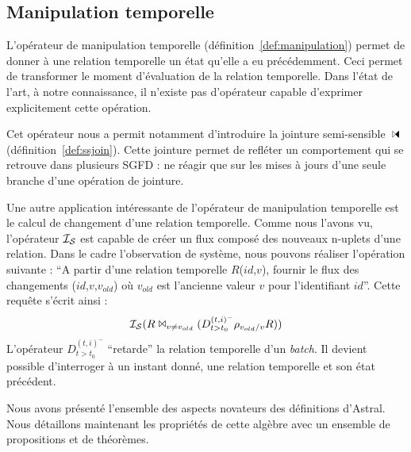 \subsection{Manipulation temporelle}
L'opérateur de manipulation temporelle (définition~\ref{def:manipulation}) permet de donner à une relation temporelle un état qu'elle a eu précédemment. Ceci permet de transformer le moment d'évaluation de la relation temporelle. Dans l'état de l'art, à notre connaissance, il n'existe pas d'opérateur capable d'exprimer explicitement cette opération.

Cet opérateur nous a permit notamment d'introduire la jointure semi-sensible $\ssjoin$ (définition~\ref{def:ssjoin}). Cette jointure permet de refléter un comportement qui se retrouve dans plusieurs SGFD : ne réagir que sur les mises à jours d'une seule branche d'une opération de jointure.

Une autre application intéressante de l'opérateur de manipulation temporelle est le calcul de changement d'une relation temporelle. Comme nous l'avons vu, l'opérateur $\mathcal{I_S}$ est capable de créer un flux composé des nouveaux n-uplets d'une relation. Dans le cadre l'observation de système, nous pouvons réaliser l'opération suivante : \enquote{A partir d'une relation temporelle $R$($id$,$v$), fournir le flux des changements ($id$,$v$,$v_{old}$) où $v_{old}$ est l'ancienne valeur $v$ pour l'identifiant $id$}. Cette requête s'écrit ainsi :
$$\mathcal{I_S}(R \Join_{v\neq v_{old}} (D^{(t,i)^-}_{t>t_0}\rho_{v_{old}/v} R))$$
L'opérateur $D^{(t,i)^-}_{t>t_0}$ \enquote{retarde} la relation temporelle d'un \textit{batch}. Il devient possible d'interroger à un instant donné, une relation temporelle et son état précédent.

Nous avons présenté l'ensemble des aspects novateurs des définitions d'Astral. Nous détaillons maintenant les propriétés de cette algèbre avec un ensemble de propositions et de théorèmes.